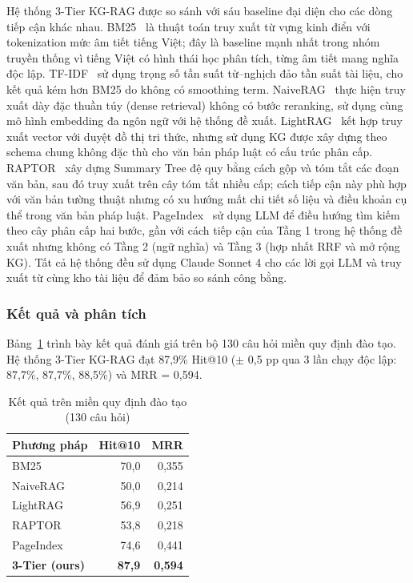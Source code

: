 Hệ thống 3-Tier KG-RAG được so sánh với sáu baseline đại diện cho các dòng tiếp
cận khác nhau. BM25~\cite{robertson2009bm25} là thuật toán truy xuất từ vựng kinh điển
với tokenization mức âm tiết tiếng Việt; đây là baseline mạnh nhất trong nhóm truyền
thống vì tiếng Việt có hình thái học phân tích, từng âm tiết mang nghĩa độc lập.
TF-IDF~\cite{manning2008ir} sử dụng trọng số tần suất từ--nghịch đảo tần suất tài liệu,
cho kết quả kém hơn BM25 do không có smoothing term. NaiveRAG~\cite{reimers2019sbert}
thực hiện truy xuất dày đặc thuần túy (dense retrieval) không có bước reranking, sử
dụng cùng mô hình embedding đa ngôn ngữ với hệ thống đề xuất. LightRAG~\cite{guo2025lightrag}
kết hợp truy xuất vector với duyệt đồ thị tri thức, nhưng sử dụng KG được xây dựng
theo schema chung không đặc thù cho văn bản pháp luật có cấu trúc phân cấp.
RAPTOR~\cite{sarthi2024raptor} xây dựng Summary Tree đệ quy bằng cách gộp và tóm
tắt các đoạn văn bản, sau đó truy xuất trên cây tóm tắt nhiều cấp; cách tiếp cận này phù
hợp với văn bản tường thuật nhưng có xu hướng mất chi tiết số liệu và điều khoản cụ
thể trong văn bản pháp luật. PageIndex~\cite{zhang2025pageindex} sử dụng LLM để
điều hướng tìm kiếm theo cây phân cấp hai bước, gần với cách tiếp cận của Tầng 1
trong hệ thống đề xuất nhưng không có Tầng 2 (ngữ nghĩa) và Tầng 3 (hợp nhất RRF
và mở rộng KG). Tất cả hệ thống đều sử dụng Claude Sonnet 4 cho các lời gọi LLM và
truy xuất từ cùng kho tài liệu để đảm bảo so sánh công bằng.

\subsubsection*{Kết quả và phân tích}

Bảng~\ref{tab:hit-daotao} trình bày kết quả đánh giá trên bộ 130 câu hỏi miền quy định đào
tạo. Hệ thống 3-Tier KG-RAG đạt 87,9\% Hit@10 ($\pm$ 0,5 pp qua 3 lần chạy độc lập:
87,7\%, 87,7\%, 88,5\%) và MRR = 0,594.

\begin{table}[htbp]
  \centering
  \caption{Kết quả trên miền quy định đào tạo (130 câu hỏi)}
  \label{tab:hit-daotao}
  \begin{tabular}{lrr}
    \toprule
    \textbf{Phương pháp} & \textbf{Hit@10} & \textbf{MRR} \\
    \midrule
    BM25      & 70{,}0 & 0{,}355 \\
    NaiveRAG  & 50{,}0 & 0{,}214 \\
    LightRAG  & 56{,}9 & 0{,}251 \\
    RAPTOR    & 53{,}8 & 0{,}218 \\
    PageIndex & 74{,}6 & 0{,}441 \\
    \textbf{3-Tier (ours)} & \textbf{87{,}9} & \textbf{0{,}594} \\
    \bottomrule
  \end{tabular}
\end{table}

